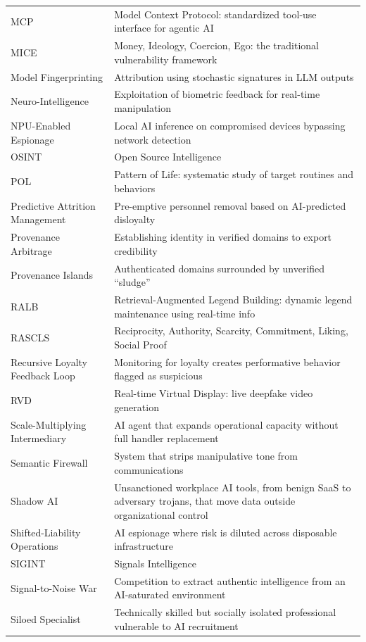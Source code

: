 \documentclass[11pt,letterpaper]{article}
\begin{document}
{\begin{longtable}{L{4.8cm}L{11.4cm}}
MCP & Model Context Protocol: standardized tool-use interface for agentic AI \\
MICE & Money, Ideology, Coercion, Ego: the traditional vulnerability framework \\
Model Fingerprinting & Attribution using stochastic signatures in LLM outputs \\
Neuro-Intelligence & Exploitation of biometric feedback for real-time manipulation \\
NPU-Enabled Espionage & Local AI inference on compromised devices bypassing network detection \\
OSINT & Open Source Intelligence \\
POL & Pattern of Life: systematic study of target routines and behaviors \\
Predictive Attrition Management & Pre-emptive personnel removal based on AI-predicted disloyalty \\
Provenance Arbitrage & Establishing identity in verified domains to export credibility \\
Provenance Islands & Authenticated domains surrounded by unverified ``sludge'' \\
RALB & Retrieval-Augmented Legend Building: dynamic legend maintenance using real-time info \\
RASCLS & Reciprocity, Authority, Scarcity, Commitment, Liking, Social Proof \\
Recursive Loyalty Feedback Loop & Monitoring for loyalty creates performative behavior flagged as suspicious \\
RVD & Real-time Virtual Display: live deepfake video generation \\
Scale-Multiplying Intermediary & AI agent that expands operational capacity without full handler replacement \\
Semantic Firewall & System that strips manipulative tone from communications \\
Shadow AI & Unsanctioned workplace AI tools, from benign SaaS to adversary trojans, that move data outside organizational control \\
Shifted-Liability Operations & AI espionage where risk is diluted across disposable infrastructure \\
SIGINT & Signals Intelligence \\
Signal-to-Noise War & Competition to extract authentic intelligence from an AI-saturated environment \\
Siloed Specialist & Technically skilled but socially isolated professional vulnerable to AI recruitment \\

\end{longtable}}
\end{document}
